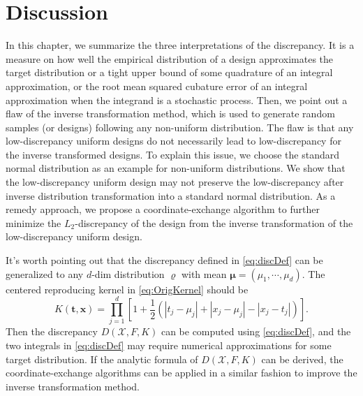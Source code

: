 \documentclass[graybox]{svmult}
\newcommand{\vx}{\boldsymbol{x}}
\newcommand{\vt}{\boldsymbol{t}}
\newcommand{\Xdes}{\mathcal{X}}
\newcommand{\Ftar}{F}
\begin{document}

\section{Discussion}
In this chapter, we summarize the three interpretations of the discrepancy. 
It is a measure on how well the empirical distribution of a design approximates the target distribution or a tight upper bound of some quadrature of an integral approximation, or the root mean squared cubature error of an integral approximation when the integrand is a stochastic process. 
Then, we point out a flaw of the inverse transformation method, which is used to generate random samples (or designs) following any non-uniform distribution. 
The flaw is that any low-discrepancy uniform designs do not necessarily lead to low-discrepancy for the inverse transformed designs. 
To explain this issue, we choose the standard normal distribution as an example for non-uniform distributions. 
We show that the low-discrepancy uniform design may not preserve the low-discrepancy after inverse distribution transformation into a standard normal distribution. 
As a remedy approach, we propose a coordinate-exchange algorithm to further minimize the $L_2$-discrepancy of the design from the inverse transformation of the low-discrepancy uniform design. 

It's worth pointing out that the discrepancy defined in \eqref{eq:discDef} can be generalized to any $d$-dim distribution $\varrho$ with mean $\boldsymbol{\mu} = (\mu_1,\cdots,\mu_d)$. The centered reproducing kernel in \eqref{eq:OrigKernel} should be 
\begin{equation} \label{ExtKernel}
     K(\vt,\vx)  = \prod\limits_{j=1}^d\left[1+ \frac 12 \left(|t_j-\mu_j|+ |x_j-\mu_j|- |x_j-t_j| \right)\right].
\end{equation}
Then the discrepancy $D(\Xdes,\Ftar,K)$ can be computed using \eqref{eq:discDef}, and the two integrals in \eqref{eq:discDef} may require numerical approximations for some target distribution. 
If the analytic formula of $D(\Xdes,\Ftar,K)$ can be derived, the coordinate-exchange algorithms can be applied in a similar fashion to improve the inverse transformation method. 
\end{document}
